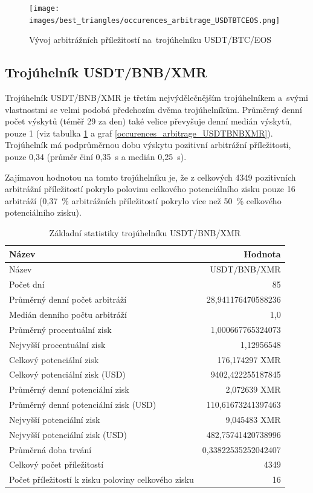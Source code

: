 \documentclass[thesis=B,czech]{FITthesis}[2019/03/21]
\begin{document}
\begin{figure}\centering
	\texttt{[image: images/best\_triangles/occurences\_arbitrage\_USDTBTCEOS.png]}
	\caption{Vývoj arbitrážních příležitostí na~trojúhelníku USDT/BTC/EOS }\label{occurences_arbitrage_USDTBTCEOS}
\end{figure}

\subsection{Trojúhelník USDT/BNB/XMR}
Trojúhelník USDT/BNB/XMR je třetím nejvýdělečnějším trojúhelníkem \linebreak a~svými vlastnostmi se velmi podobá předchozím dvěma trojúhelníkům. Průměrný denní počet výskytů (téměř 29 za den) také velice převyšuje denní medián výskytů, pouze 1 (viz tabulka \ref{USDTBNBXMR_stats} a graf \ref{occurences_arbitrage_USDTBNBXMR}). Trojúhelník má \linebreak podprůměrnou dobu výskytu pozitivní arbitrážní příležitosti, pouze 0,34 (průměr činí 0,35~s a medián 0,25~s).

Zajímavou hodnotou na tomto trojúhelníku je, že z celkových 4349 pozitivních arbitrážní příležitostí pokrylo polovinu celkového potenciálního zisku pouze 16 arbitráží (0,37~\% arbitrážních příležitostí pokrylo více než 50~\% celkového potenciálního zisku).

\begin{table}\centering
\caption{Základní statistiky trojúhelníku USDT/BNB/XMR}
\label{USDTBNBXMR_stats}
\begin{tabular}{|| l | r ||}
\hline Název & Hodnota \\ 
\hline\hline Název & USDT/BNB/XMR \\ 
\hline Počet dní & 85 \\ 
\hline Průměrný denní počet arbitráží & 28,941176470588236 \\ 
\hline Medián denního počtu arbitráží & 1,0 \\ 
\hline Průměrný procentuální zisk & 1,000667765324073 \\ 
\hline Nejvyšší procentuální zisk & 1,12956548 \\ 
\hline Celkový potenciální zisk & 176,174297 XMR \\ 
\hline Celkový potenciální zisk (USD) & 9402,422255187845 \\ 
\hline Průměrný denní potenciální zisk & 2,072639 XMR \\ 
\hline Průměrný denní potenciální zisk (USD) & 110,61673241397463 \\ 
\hline Nejvyšší potenciální zisk & 9,045483 XMR \\ 
\hline Nejvyšší potenciální zisk (USD) & 482,75741420738996 \\ 
\hline Průměrná doba trvání & 0,33822535252042407 \\ 
\hline Celkový počet příležitostí & 4349 \\ 
\hline Počet příležitostí k zisku poloviny celkového zisku & 16 \\ 
\hline
\end{tabular}
\end{table}
\end{document}
